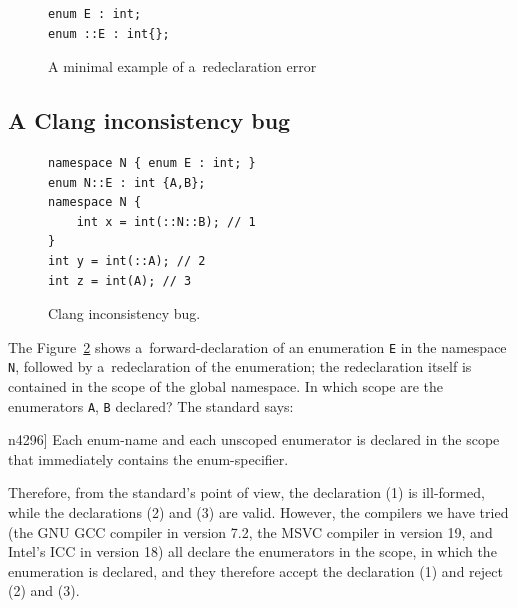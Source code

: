 \documentclass[nolot,nolof,nocover,printed]{fithesis3}
\newcommand{\stdN}[2]{\cite[#2]{#1}\xspace}
\begin{document}
\begin{figure}[ht]
\begin{lstlisting}
enum E : int;
enum ::E : int{};
\end{lstlisting}
\caption{A minimal example of a~redeclaration error}
\label{fig:gccRedeclarationBug}
\end{figure}

\subsection{A Clang inconsistency bug}


\begin{figure}
\begin{lstlisting}
namespace N { enum E : int; }
enum N::E : int {A,B};
namespace N {
    int x = int(::N::B); // 1
}
int y = int(::A); // 2
int z = int(A); // 3
\end{lstlisting}
\caption{Clang inconsistency bug.}
\label{fig:clangInconsistencyBug}
\end{figure}

The Figure~\ref{fig:clangInconsistencyBug} shows a~forward-declaration of an enumeration \lstinline|E| in the namespace \lstinline|N|, followed by a~redeclaration of the enumeration; the redeclaration itself is contained in the scope of the global namespace. In which scope are the enumerators \lstinline|A|, \lstinline|B| declared? The standard says:
\begin{displayquote}[\stdN{n4296}{\S 7.2/11}]
Each enum-name and each unscoped enumerator is declared in the scope that immediately contains the
enum-specifier.
\end{displayquote}
Therefore, from the standard's point of view, the declaration (1) is ill-formed, while the declarations (2) and (3) are valid. However, the compilers we have tried (the GNU GCC compiler in version 7.2, the MSVC compiler in version 19, and Intel's ICC in version 18) all declare the enumerators in the scope, in which the enumeration is declared, and they therefore accept the declaration (1) and reject (2) and (3).
\end{document}
